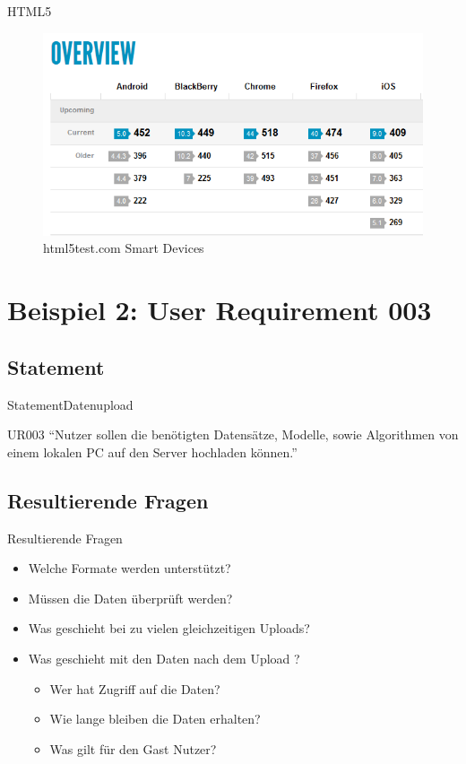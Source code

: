 \documentclass{beamer}
\begin{document}
	\begin{frame}[t]{HTML5}
		\begin{figure}
			\centering
			\includegraphics[width=1\linewidth]{Bilder/HTML5Mobile}
			\caption{html5test.com Smart Devices}
			\label{fig:HTML5Mobile}
		\end{figure}

	\end{frame}
	
	\section[UR003]{Beispiel 2: User Requirement 003}
	\subsection[Statement]{Statement}
	\begin{frame}{Statement}{Datenupload}
		\begin{block}{UR003}
			"`Nutzer sollen die benötigten Datensätze, Modelle, sowie Algorithmen von einem lokalen PC auf den Server hochladen können."'
		\end{block}
			
	\end{frame}
	
	\subsection[Resultierende Fragen]{Resultierende Fragen}
	\begin{frame}[<+->][t]{Resultierende Fragen}
		\begin{itemize}		
			\item Welche Formate werden unterstützt?
			\item Müssen die Daten überprüft werden?
			\item Was geschieht bei zu vielen gleichzeitigen Uploads?
			\item Was geschieht mit den Daten nach dem Upload ?
			\begin{itemize}	
				\item Wer hat Zugriff auf die Daten?
				\item Wie lange bleiben die Daten erhalten?
				\item Was gilt für den Gast Nutzer?
			\end{itemize}
		\end{itemize}
	\end{frame}
	
\end{document}
